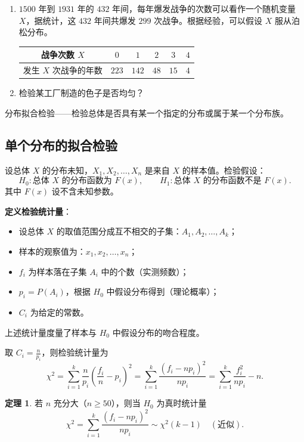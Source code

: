 \documentclass[11pt,a4paper]{report}
\theoremstyle{definition}
\newtheorem{theorem}{定理}[chapter]
\begin{document}
\begin{enumerate}[label=(\arabic*)]
    \item $1500$ 年到 $1931$ 年的 $432$ 年间，每年爆发战争的次数可以看作一个随机变量 $X$，据统计，这 $432$ 年间共爆发 $299$ 次战争。根据经验，可以假设 $X$ 服从泊松分布。
    \begin{table}[htbp]
    \centering
    \begin{tabular}{@{}cccccc@{}}
    \toprule
    战争次数 $X$ & $0$ & $1$ & $2$ & $3$ & $4$ \\
    \midrule
    发生 $X$ 次战争的年数 & $223$ & $142$ & $48$ & $15$ & $4$ \\
    \bottomrule
    \end{tabular}
    \end{table}
    \item 检验某工厂制造的色子是否均匀？
\end{enumerate}

分布拟合检验——检验总体是否具有某一个指定的分布或属于某一个分布族。

\subsection{单个分布的拟合检验}

设总体 $X$ 的分布未知，$X_{1},X_{2},\ldots,X_{n}$ 是来自 $X$ 的样本值。检验假设：
\[
H_{0}\colon\text{总体 }X\text{ 的分布函数为 }F(x),\qquad H_{1}\colon\text{总体 }X\text{ 的分布函数不是 }F(x).
\]
其中 $F(x)$ 设不含未知参数。

\textbf{定义检验统计量}：
\begin{itemize}[leftmargin=2em]
    \item 设总体 $X$ 的取值范围分成互不相交的子集：$A_{1},A_{2},\ldots,A_{k}$；
    \item 样本的观察值为：$x_{1},x_{2},\ldots,x_{n}$；
    \item $f_{i}$ 为样本落在子集 $A_{i}$ 中的个数（实测频数）；
    \item $p_{i}=P(A_{i})$，根据 $H_{0}$ 中假设分布得到（理论概率）；
    \item $C_{i}$ 为给定的常数。
\end{itemize}
上述统计量度量了样本与 $H_{0}$ 中假设分布的吻合程度。

取 $C_{i}=\frac{n}{p_{i}}$，则检验统计量为
\[
\chi^{2}=\sum_{i=1}^{k}\frac{n}{p_{i}}\left(\frac{f_{i}}{n}-p_{i}\right)^{2}=\sum_{i=1}^{k}\frac{(f_{i}-np_{i})^{2}}{np_{i}}=\sum_{i=1}^{k}\frac{f_{i}^{2}}{np_{i}}-n.
\]

\begin{theorem}
若 $n$ 充分大（$n\geq 50$），则当 $H_{0}$ 为真时统计量
\[
\chi^{2}=\sum_{i=1}^{k}\frac{(f_{i}-np_{i})^{2}}{np_{i}}\sim\chi^{2}(k-1)\quad(\text{近似}).
\]
\end{theorem}
\end{document}
